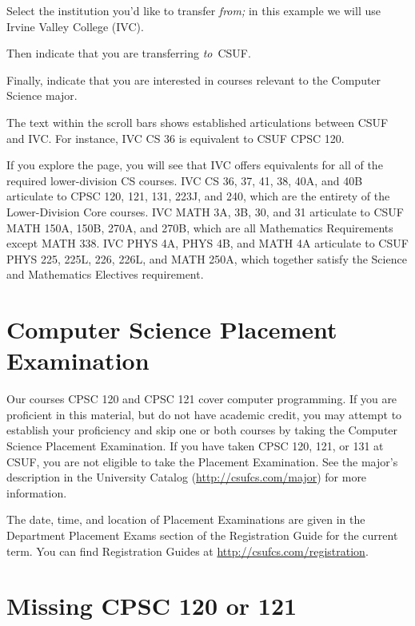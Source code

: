 \documentclass{book}
\newcommand{\CampusName}{CSUF}
\newcommand{\shrunkurl}[1]{\url{http://csufcs.com/#1}}
\begin{document}
Select the institution you'd like to transfer \emph{from;} in this
example we will use Irvine Valley College (IVC).


Then indicate that you are transferring \emph{to}~\CampusName.


Finally, indicate that you are interested in courses relevant to the
Computer Science major.


The text within the scroll bars shows established articulations
between CSUF and IVC. For instance, IVC CS 36 is equivalent to CSUF
CPSC 120.


If you explore the page, you will see that IVC offers equivalents for
all of the required lower-division CS courses. IVC CS 36, 37, 41, 38,
40A, and 40B articulate to CPSC 120, 121, 131, 223J, and 240, which
are the entirety of the Lower-Division Core courses. IVC MATH 3A, 3B,
30, and 31 articulate to CSUF MATH 150A, 150B, 270A, and 270B, which
are all Mathematics Requirements except MATH 338. IVC PHYS 4A, PHYS
4B, and MATH 4A articulate to CSUF PHYS 225, 225L, 226, 226L, and MATH
250A, which together satisfy the Science and Mathematics Electives
requirement.

\section{Computer Science Placement Examination}
\label{section:placement}
 Our courses CPSC 120 and CPSC 121 cover
computer programming. If you are proficient in this material, but do
not have academic credit, you may attempt to establish your
proficiency and skip one or both courses by taking the Computer
Science Placement Examination. If you have taken CPSC 120, 121, or 131
at \CampusName, you are not eligible to take the Placement
Examination. See the major's description in the University Catalog
(\shrunkurl{major}) for more information.

The date, time, and location of Placement Examinations are given in
the Department Placement Exams section of the Registration Guide for
the current term. You can find Registration Guides at
\shrunkurl{registration}.

\section{Missing CPSC 120 or 121}
\end{document}
